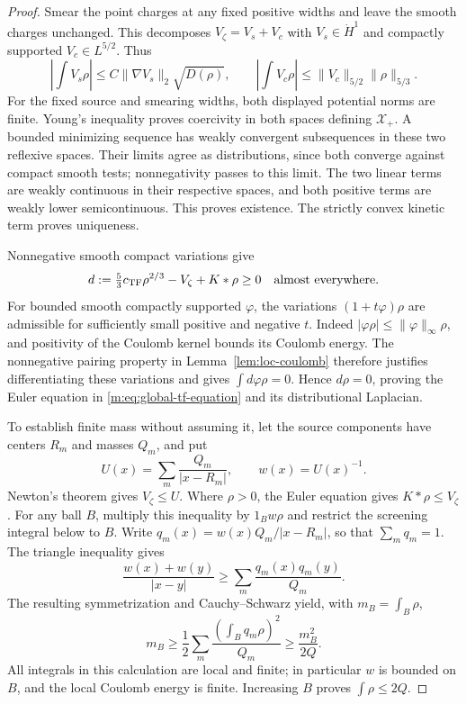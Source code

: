 \begin{proof}
Smear the point charges at any fixed positive widths and leave the
smooth charges unchanged.  This decomposes $V_\zeta=V_s+V_c$ with
$V_s\in\dot H^1$ and compactly supported $V_c\in L^{5/2}$.  Thus
\[
 \left|\int V_s\rho\right|
     \le C\|\nabla V_s\|_2\sqrt{D(\rho)},\qquad
 \left|\int V_c\rho\right|
     \le\|V_c\|_{5/2}\|\rho\|_{5/3}.
\]
For the fixed source and smearing widths, both displayed potential norms
are finite. Young's inequality proves coercivity in both spaces defining
$\mathcal X_+$.  A bounded minimizing sequence has weakly convergent
subsequences in these two reflexive spaces.  Their limits agree as
distributions, since both converge against compact smooth tests;
nonnegativity passes to this limit.  The two linear terms are weakly
continuous in their respective spaces, and both positive terms are
weakly lower semicontinuous.  This proves existence.  The strictly
convex kinetic term proves uniqueness.

Nonnegative smooth compact variations give
\[
 d:=\tfrac53c_{\mathrm{TF}}\rho^{2/3}-V_\zeta+K*\rho\ge0
 \quad\text{almost everywhere}.
\]
For bounded smooth compactly supported $\varphi$, the variations
$(1+t\varphi)\rho$ are admissible for sufficiently small positive and
negative $t$.  Indeed $|\varphi\rho|\le\|\varphi\|_\infty\rho$, and
positivity of the Coulomb kernel bounds its Coulomb energy.  The
nonnegative pairing property in Lemma~\ref{lem:loc-coulomb} therefore
justifies differentiating these variations and gives
$\int d\varphi\rho=0$.  Hence $d\rho=0$, proving the Euler equation in
\eqref{m:eq:global-tf-equation} and its distributional Laplacian.

To establish finite mass without assuming it, let the source components
have centers $R_m$ and masses $Q_m$, and put
\[
 U(x)=\sum_m\frac{Q_m}{|x-R_m|},\qquad w(x)=U(x)^{-1}.
\]
Newton's theorem gives $V_\zeta\le U$.  Where $\rho>0$, the Euler
equation gives $K*\rho\le V_\zeta$.  For any ball $B$, multiply this
inequality by $1_Bw\rho$ and restrict the screening integral below to
$B$.  Write
$q_m(x)=w(x)Q_m/|x-R_m|$, so that $\sum_mq_m=1$.  The triangle
inequality gives
\[
 \frac{w(x)+w(y)}{|x-y|}
     \ge\sum_m\frac{q_m(x)q_m(y)}{Q_m}.
\]
The resulting symmetrization and Cauchy--Schwarz yield, with
$m_B=\int_B\rho$,
\[
 m_B\ge\frac12\sum_m\frac{(\int_Bq_m\rho)^2}{Q_m}
       \ge\frac{m_B^2}{2Q}.
\]
All integrals in this calculation are local and finite; in particular
$w$ is bounded on $B$, and the local Coulomb energy is finite.  Increasing
$B$ proves $\int\rho\le2Q$.


\end{proof}
